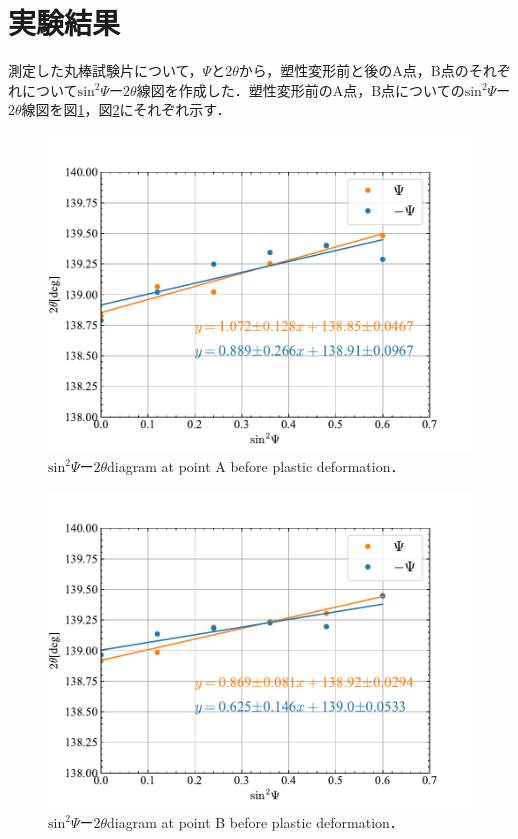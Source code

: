 \section{実験結果}

測定した丸棒試験片について，$\Psi$と$2\theta$から，塑性変形前と後のA点，B点のそれぞれについて$\mathrm{sin}^2\Psi$ー$2\theta$線図を作成した．塑性変形前のA点，B点についての$\mathrm{sin}^2\Psi$ー$2\theta$線図を図\ref{fig:fig_BeforeRed}，図\ref{fig:fig_BeforeBlack}にそれぞれ示す．
\begin{figure}[htbp]
    \centering %
    \includegraphics[width=100truemm,clip]{fig/fig_BeforeRed.pdf}
    \caption{$\mathrm{sin}^2\Psi$ー$2\theta$diagram at point A before plastic deformation．}
    \label{fig:fig_BeforeRed}
\end{figure}
\begin{figure}[htbp]
    \centering %
    \includegraphics[width=100truemm,clip]{fig/fig_BeforeBlack.pdf}
    \caption{$\mathrm{sin}^2\Psi$ー$2\theta$diagram at point B before plastic deformation．}
    \label{fig:fig_BeforeBlack}
\end{figure}
